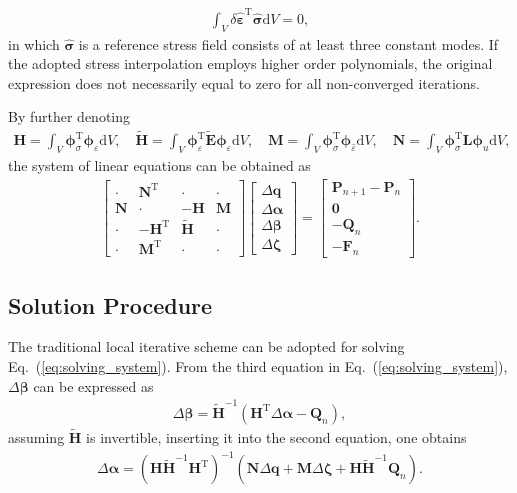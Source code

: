 \documentclass[3p,sort&compress,review,11pt]{elsarticle}
\newcommand*{\md}[1]{\mathrm{d}#1}
\newcommand*{\va}[1]{\delta#1}
\newcommand*{\mT}{\mathrm{T}}
\newcommand*{\eqsref}[1]{Eq.~(\ref{#1})}
\newcommand*{\mb}{\bm}
\begin{document}
\begin{gather*}
\int_V\va{\hat{\mb{\varepsilon}}}^\mT\hat{\mb{\sigma}}\md{V}=0,
\end{gather*}
in which $\hat{\mb{\sigma}}$ is a reference stress field consists of at least three constant modes. If the adopted stress interpolation employs higher order polynomials, the original expression does not necessarily equal to zero for all non-converged iterations.

By further denoting
\begin{gather}
\mb{H}=\int_{V}\mb{\phi}_\sigma^\mT\mb{\phi}_\varepsilon\md{V},\quad
\tilde{\mb{H}}=\int_{V}\mb{\phi}_\varepsilon^\mT\tilde{\mb{E}}\mb{\phi}_\varepsilon\md{V},\quad
\mb{M}=\int_{V}\mb{\phi}_\sigma^\mT\mb{\phi}_{\hat{\varepsilon}}\md{V},\quad
\mb{N}=\int_{V}\mb{\phi}_\sigma^\mT\mb{L}\mb{\phi}_u\md{V},
\end{gather}
the system of linear equations can be obtained as
\begin{gather}\label{eq:solving_system}
\begin{bmatrix}
	\cdot        & \mb{N}^\mT  & \cdot                & \cdot        \\
	\mb{N} & \cdot             & -\mb{H}        & \mb{M} \\
	\cdot        & -\mb{H}^\mT & \tilde{\mb{H}} & \cdot        \\
	\cdot        & \mb{M}^\mT  & \cdot                & \cdot
\end{bmatrix}\begin{bmatrix}
\Delta\mb{q}\\\Delta\mb{\alpha}\\\Delta\mb{\beta}\\\Delta\mb{\zeta}
\end{bmatrix}=\begin{bmatrix}
\mb{P}_{n+1}-\mb{P}_n\\\mb{0}\\-\mb{Q}_n\\-\mb{F}_n
\end{bmatrix}.
\end{gather}
\subsection{Solution Procedure}
The traditional local iterative scheme can be adopted for solving \eqsref{eq:solving_system}. From the third equation in \eqsref{eq:solving_system}, $\Delta\mb{\beta}$ can be expressed as
\begin{gather*}
\Delta\mb{\beta}=\tilde{\mb{H}}^{-1}\left(\mb{H}^\mT\Delta\mb{\alpha}-\mb{Q}_n\right),
\end{gather*}
assuming $\tilde{\mb{H}}$ is invertible, inserting it into the second equation, one obtains
\begin{gather*}
\Delta\mb{\alpha}=\left(\mb{H}\tilde{\mb{H}}^{-1}\mb{H}^\mT\right)^{-1}\left(\mb{N}\Delta\mb{q}+\mb{M}\Delta\mb{\zeta}+\mb{H}\tilde{\mb{H}}^{-1}\mb{Q}_n\right).
\end{gather*}
\end{document}
